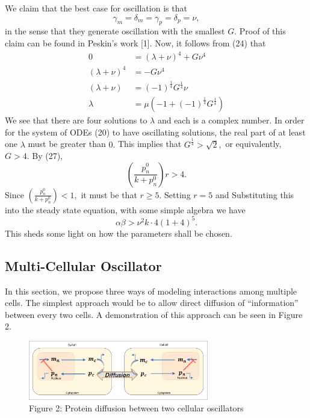 \documentclass[12pt]{article}
\renewcommand{\(}{\left (}
\renewcommand{\)}{\right )}
\begin{document}
We claim that the best case for oscillation is that
\begin{equation}
    \gamma_m = \delta_m = \gamma_p = \delta_p = \nu,
\end{equation}
in the sense that they generate oscillation with the smallest $G.$ Proof of this claim can be found in Peskin's work [1]. Now, it follows from (24) that
\begin{align}
    0 &= (\lambda + \nu)^4 + G \nu ^4 \\
    (\lambda + \nu)^4 &= -G \nu ^4 \\
    (\lambda + \nu) &= (-1)^\frac{1}{4} G ^\frac{1}{4}\nu\\
    \lambda &= \mu (-1 + (-1)^\frac{1}{4} G ^\frac{1}{4})
\end{align}
We see that there are four solutions to $\lambda$ and each is a complex number. In order for the system of ODEs (20) to have oscillating solutions, the real part of at least one $\lambda$ must be greater than $0.$ This implies that $G^\frac{1}{4} > \sqrt{2},$ or equivalently, $G>4.$ By (27), \begin{equation}
    \left(\frac{p_n^0}{k+p_n^0}\right) r > 4.
\end{equation}
Since $ \left(\frac{p_n^0}{k+p_n^0}\right) < 1,$ it must be that $r\geq 5.$ Setting $r=5$ and Substituting this into the steady state equation, with some simple algebra we have
\begin{equation}
    \alpha \beta > \nu^2 k \cdot 4(1+4)^5.
\end{equation}
This sheds some light on how the parameters shall be chosen.

\subsection{Multi-Cellular Oscillator}
\hspace{5mm} In this section, we propose three ways of modeling interactions among multiple cells. The simplest approach would be to allow direct diffusion of ``information'' between every two cells. A demonstration of this approach can be seen in Figure 2. \\
\begin {figure}[h]
	\centering
	\includegraphics[width=0.7\textwidth]{two_cells.png}
	\caption*{\small Figure 2: Protein diffusion between two cellular oscillators}
\end {figure}
\end{document}
